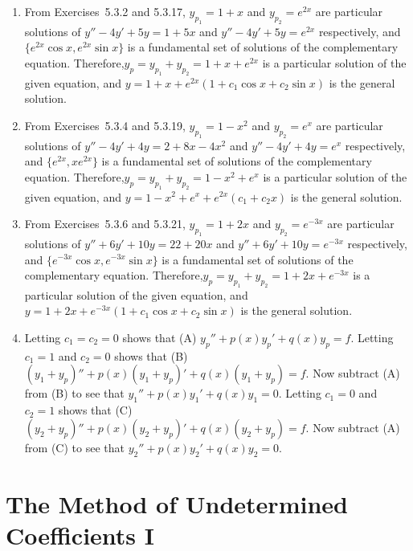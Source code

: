 \documentclass[openany]{book}
\newenvironment{sectionSolutions}{
 \begin{enumerate}[item-label={\thesection.\arabic{enumi}.}]
}{
 \end{enumerate}
}
\begin{document}
\begin{sectionSolutions}
\item
From Exercises~5.3.2 and 5.3.17,
$y_{p_1}=1+x$ and $y_{p_2}=e^{2x}$  are particular solutions of
$y''-4y'+5y=1+5x$
and
$y''-4y'+5y=e^{2x}$
respectively, and $\{e^{2x}\cos x,e^{2x}\sin x\}$
is a fundamental set of solutions of the  complementary equation.
Therefore,$y_p=y_{p_1}+y_{p_2}=1+x+e^{2x}$
is a particular solution of the given equation, and
$y=1+x+e^{2x}(1+c_1\cos x+c_2\sin x)$
is the general solution.


\item
From Exercises~5.3.4 and 5.3.19,
$y_{p_1}=1-x^2$ and $y_{p_2}=e^{x}$  are particular solutions of
$y''-4y'+4y=2+8x-4x^2$
and
$y''-4y'+4y=e^{x}$
respectively, and $\{e^{2x},xe^{2x}\}$
is a fundamental set of solutions of the complementary equation.
Therefore,$y_p=y_{p_1}+y_{p_2}=1-x^2+e^{x}$
is a particular solution of the given equation, and
$y=1-x^2+e^{x}+e^{2x}(c_1+c_2x)$
is the general solution.


\item
From Exercises~5.3.6 and 5.3.21,
$y_{p_1}=1+2x$ and $y_{p_2}=e^{-3x}$  are particular solutions of
$y''+6y'+10y=22+20x$
and
$y''+6y'+10y=e^{-3x}$
respectively, and $\{e^{-3x}\cos x,e^{-3x}\sin x\}$
is a fundamental set of solutions of the complementary equation.
Therefore,$y_p=y_{p_1}+y_{p_2}=1+2x+e^{-3x}$
is a particular solution of the given equation, and
$y=1+2x+e^{-3x}(1+c_1\cos x+c_2\sin x)$
is the general solution.

\item
Letting $c_1=c_2=0$ shows that (A) $y_p''+p(x)y_p'+q(x)y_p=f$.
Letting $c_1=1$ and $c_2=0$ shows that  (B) $(y_1+y_p)''+
p(x)(y_1+y_p)'+q(x)(y_1+y_p)=f$. Now subtract (A) from (B)
to see that $y_1''+p(x)y_1'+q(x)y_1=0$.
Letting $c_1=0$ and $c_2=1$ shows that  (C) $(y_2+y_p)''+
p(x)(y_2+y_p)'+q(x)(y_2+y_p)=f$. Now subtract (A) from (C)
to see that $y_2''+p(x)y_2'+q(x)y_2=0$.
\end{sectionSolutions}

\section{The Method of Undetermined Coefficients I}
\end{document}
